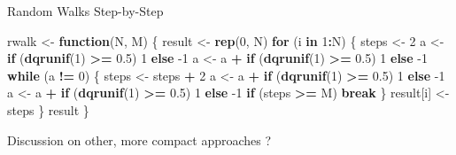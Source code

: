 \documentclass[ignorenonframetext,]{beamer}
\newenvironment{Shaded}{\begin{snugshade}}{\end{snugshade}}
\newcommand{\ControlFlowTok}[1]{\textcolor[rgb]{0.13,0.29,0.53}{\textbf{#1}}}
\newcommand{\DecValTok}[1]{\textcolor[rgb]{0.00,0.00,0.81}{#1}}
\newcommand{\FloatTok}[1]{\textcolor[rgb]{0.00,0.00,0.81}{#1}}
\newcommand{\KeywordTok}[1]{\textcolor[rgb]{0.13,0.29,0.53}{\textbf{#1}}}
\newcommand{\NormalTok}[1]{#1}
\newcommand{\OperatorTok}[1]{\textcolor[rgb]{0.81,0.36,0.00}{\textbf{#1}}}
\newcommand{\StringTok}[1]{\textcolor[rgb]{0.31,0.60,0.02}{#1}}
\begin{document}
\begin{frame}[fragile]{Random Walks Step-by-Step}
\protect\hypertarget{random-walks-step-by-step}{}

\begin{Shaded}
\begin{Highlighting}[]
\NormalTok{rwalk <-}\StringTok{ }\ControlFlowTok{function}\NormalTok{(N, M) \{}
\NormalTok{    result <-}\StringTok{ }\KeywordTok{rep}\NormalTok{(}\DecValTok{0}\NormalTok{, N)}
    \ControlFlowTok{for}\NormalTok{ (i }\ControlFlowTok{in} \DecValTok{1}\OperatorTok{:}\NormalTok{N) \{}
\NormalTok{        steps <-}\StringTok{ }\DecValTok{2}
\NormalTok{        a <-}\StringTok{ }\ControlFlowTok{if}\NormalTok{ (}\KeywordTok{dqrunif}\NormalTok{(}\DecValTok{1}\NormalTok{) }\OperatorTok{>=}\StringTok{ }\FloatTok{0.5}\NormalTok{) }\DecValTok{1} \ControlFlowTok{else} \DecValTok{-1}
\NormalTok{        a <-}\StringTok{ }\NormalTok{a }\OperatorTok{+}\StringTok{ }\ControlFlowTok{if}\NormalTok{ (}\KeywordTok{dqrunif}\NormalTok{(}\DecValTok{1}\NormalTok{) }\OperatorTok{>=}\StringTok{ }\FloatTok{0.5}\NormalTok{) }\DecValTok{1} \ControlFlowTok{else} \DecValTok{-1}
        \ControlFlowTok{while}\NormalTok{ (a }\OperatorTok{!=}\StringTok{ }\DecValTok{0}\NormalTok{) \{}
\NormalTok{            steps <-}\StringTok{ }\NormalTok{steps }\OperatorTok{+}\StringTok{ }\DecValTok{2}
\NormalTok{            a <-}\StringTok{ }\NormalTok{a }\OperatorTok{+}\StringTok{ }\ControlFlowTok{if}\NormalTok{ (}\KeywordTok{dqrunif}\NormalTok{(}\DecValTok{1}\NormalTok{) }\OperatorTok{>=}\StringTok{ }\FloatTok{0.5}\NormalTok{) }\DecValTok{1} \ControlFlowTok{else} \DecValTok{-1}
\NormalTok{            a <-}\StringTok{ }\NormalTok{a }\OperatorTok{+}\StringTok{ }\ControlFlowTok{if}\NormalTok{ (}\KeywordTok{dqrunif}\NormalTok{(}\DecValTok{1}\NormalTok{) }\OperatorTok{>=}\StringTok{ }\FloatTok{0.5}\NormalTok{) }\DecValTok{1} \ControlFlowTok{else} \DecValTok{-1}
            \ControlFlowTok{if}\NormalTok{ (steps }\OperatorTok{>=}\StringTok{ }\NormalTok{M) }\ControlFlowTok{break}
\NormalTok{        \}}
\NormalTok{        result[i] <-}\StringTok{ }\NormalTok{steps}
\NormalTok{    \}}
\NormalTok{    result}
\NormalTok{\}}
\end{Highlighting}
\end{Shaded}

Discussion on other, more compact approaches ?

\end{frame}
\end{document}
